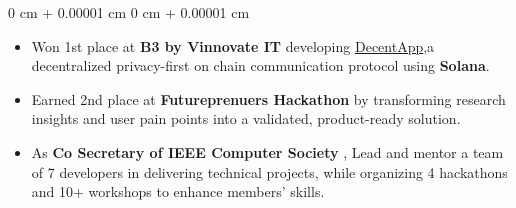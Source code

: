 \documentclass[10pt, letterpaper]{article}
\newenvironment{highlights}{
    \begin{itemize}[
        topsep=0.10 cm,
        parsep=0.10 cm,
        partopsep=0pt,
        itemsep=0pt,
        leftmargin=0 cm + 10pt
    ]
}{
    \end{itemize}
}
\newenvironment{onecolentry}{
    \begin{adjustwidth}{
        0 cm + 0.00001 cm
    }{
        0 cm + 0.00001 cm
    }
}{
    \end{adjustwidth}
}
\begin{document}
    \begin{onecolentry}
        \begin{highlights}
            \item Won 1st place at \textbf{B3 by Vinnovate IT} developing \href{https://github.com/utk2602/B3-Decentapp}{DecentApp},a decentralized privacy-first on chain communication protocol using \textbf{Solana}.
            \item Earned 2nd place at \textbf{Futureprenuers Hackathon} by transforming research insights and user pain points into a validated, product-ready solution.
            \item As \textbf{Co Secretary of IEEE Computer Society} , Lead and mentor a team of 7 developers in delivering  technical
projects, while organizing 4 hackathons and 10+ workshops to enhance members'
skills.
            
        \end{highlights}
    \end{onecolentry}
\end{document}
